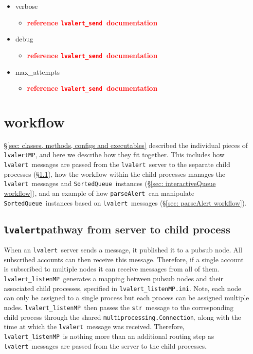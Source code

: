 \documentclass{article}
\newcommand{\FIXME}[1]{\textcolor{red}{\textbf{#1}}}
\newcommand{\multiprocessingConnection}{\texttt{multiprocessing.Connection}}
\newcommand{\alert}{\texttt{lvalert}}
\newcommand{\lvalertSend}{\texttt{lvalert\_send}}
\newcommand{\lvalertMP}{\texttt{lvalertMP}}
\newcommand{\lvalertListenMP}{\texttt{lvalert\_listenMP}}
\newcommand{\parseAlert}{\texttt{parseAlert}}
\newcommand{\SortedQueue}{\texttt{SortedQueue}}
\newcommand{\lvalertMPini}{\texttt{lvalert\_listenMP.ini}}
\newcommand{\pythonstr}{\texttt{str}}
\begin{document}
\begin{itemize}
{\begin{itemize}
        \end{itemize}
         }
    \item{verbose
        \begin{itemize}
            \item{\FIXME{reference \lvalertSend~documentation}}
        \end{itemize}
         }
    \item{debug
        \begin{itemize}
            \item{\FIXME{reference \lvalertSend~documentation}}
        \end{itemize}
         }
    \item{max\_attempts
        \begin{itemize}
            \item{\FIXME{reference \lvalertSend~documentation}}
        \end{itemize}
         }
\end{itemize}


\section{workflow}
\label{sec: workflow}

\S\ref{sec: classes, methods, configs and executables} described the individual pieces of \lvalertMP, and here we describe how they fit together.
This includes how \alert~messages are passed from the \alert~server to the separate child processes (\S\ref{sec: passing alerts}), how the workflow within the child processes manages the \alert~messages and \SortedQueue~instances (\S\ref{sec: interactiveQueue workflow}), and an example of how \parseAlert~can manipulate \SortedQueue~instances based on \alert~messages (\S\ref{sec: parseAlert workflow}).


\subsection{\alert pathway from server to child process}
\label{sec: passing alerts}

When an \alert~server sends a message, it published it to a pubsub node.
All subscribed accounts can then receive this message.
Therefore, if a single account is subscribed to multiple nodes it can receive messages from all of them.
\lvalertListenMP~generates a mapping between pubsub nodes and their associated child processes, specified in \lvalertMPini.
Note, each node can only be assigned to a single process but each process can be assigned multiple nodes.
\lvalertListenMP~then passes the \pythonstr~message to the corresponding child process through the shared \multiprocessingConnection, along with the time at which the \alert~message was received.
Therefore, \lvalertListenMP~is nothing more than an additional routing step as \alert~messages are passed from the server to the child processes.
\end{document}
